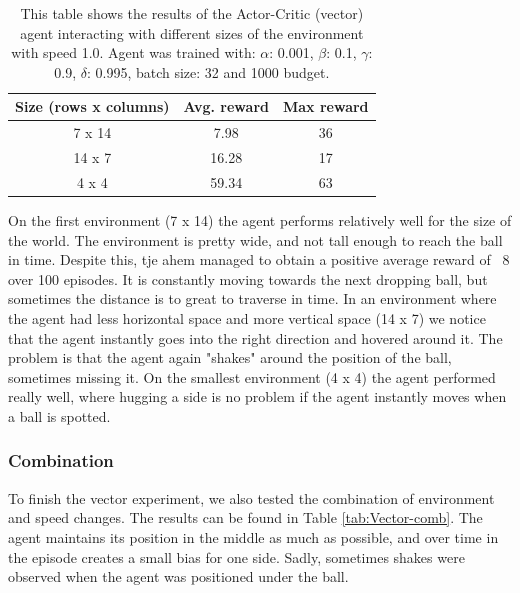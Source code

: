 \documentclass{article}
\begin{document}
\begin{table}[htbp]
    \centering
    \begin{tabular}{|c|c|c|}
        \hline
        \textbf{Size (rows x columns)} & \textbf{Avg. reward} & \textbf{Max reward} \\
        \hline
        7 x 14                & 7.98       & 36                  \\
        14 x 7                & 16.28       & 17                  \\
        4 x 4                 & 59.34       & 63             \\
        \hline
    \end{tabular}
    \caption{This table shows the results of the Actor-Critic (vector) agent interacting with different sizes of the environment with speed 1.0. 
    Agent was trained with: $\alpha$: 0.001, $\beta$: 0.1, $\gamma$: 0.9, $\delta$: 0.995, batch size: 32 and 1000 budget. }
    \label{tab:Vector-size}
\end{table}

On the first environment (7 x 14) the agent performs relatively well for the size of the world.
The environment is pretty wide, and not tall enough to reach the ball in time. 
Despite this, tje ahem managed to obtain a positive average reward of ~8 over 100 episodes. 
It is constantly moving towards the next dropping ball, but sometimes the distance is to great to traverse in time. 
In an environment where the agent had less horizontal space and more vertical space (14 x 7) we notice that the agent instantly goes into the right direction and hovered around it.
The problem is that the agent again "shakes" around the position of the ball, sometimes missing it. 
On the smallest environment (4 x 4) the agent performed really well, where hugging a side is no problem if the agent instantly moves when a ball is spotted.

\subsubsection{Combination}
To finish the vector experiment, we also tested the combination of environment and speed changes.
The results can be found in Table \ref{tab:Vector-comb}. 
The agent maintains its position in the middle as much as possible, and over time in the episode creates a small bias for one side.
Sadly, sometimes shakes were observed when the agent was positioned under the ball.  
\end{document}
